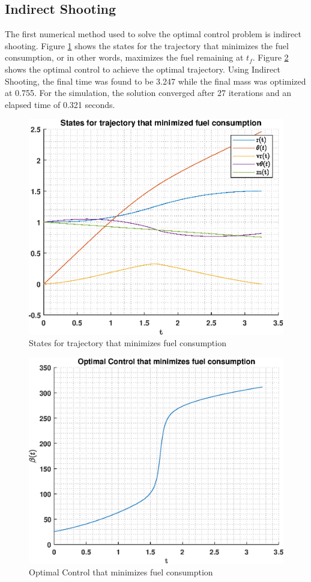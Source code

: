 \documentclass[]{article}
\begin{document}
\subsection{Indirect Shooting}
The first numerical method used to solve the optimal control problem is indirect shooting. Figure \ref{fig:indirectStates} shows the states for the trajectory that minimizes the fuel consumption, or in other words, maximizes the fuel remaining at \(t_f\). Figure \ref{fig:indirectControl} shows the optimal control to achieve the optimal trajectory. Using Indirect Shooting, the final time was found to be 3.247 while the final mass was optimized at 0.755. For the simulation, the solution converged after 27 iterations and an elapsed time of 0.321 seconds.
\begin{figure}[hbt!]
	\centering
	\includegraphics[scale=0.75]{indirectStates.eps}
    \caption{States for trajectory that minimizes fuel consumption}
	\label{fig:indirectStates}
\end{figure}
\begin{figure}
	\centering
	\includegraphics[scale=0.75]{indirectControl.eps}
	\caption{Optimal Control that minimizes fuel consumption}
	\label{fig:indirectControl}
\end{figure}
\FloatBarrier
\end{document}
